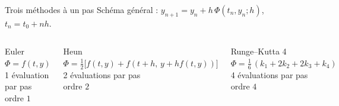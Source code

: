 \documentclass[aspectratio=169,11pt]{beamer}
\begin{document}
\begin{frame}{Trois méthodes à un pas}
  Schéma général : \quad $y_{n+1}=y_n+h\,\Phi(t_n,y_n;h)$, \quad $t_n=t_0+nh$.
  \vspace{0.8em}
  \begin{columns}[T]
    \begin{block}{Euler}
      \small $\Phi=f(t,y)$\\[0.4em]
      1 évaluation par pas\\
      ordre $1$
    \end{block}
    \begin{block}{Heun}
      \small $\Phi=\tfrac12\bigl[f(t,y)+f(t+h,\,y+hf(t,y))\bigr]$\\[0.4em]
      2 évaluations par pas\\
      ordre $2$
    \end{block}
    \begin{block}{Runge--Kutta 4}
      \small $\Phi=\tfrac16\,(k_1+2k_2+2k_3+k_4)$\\[0.4em]
      4 évaluations par pas\\
      ordre $4$
    \end{block}
  \end{columns}
\end{frame}
\end{document}
